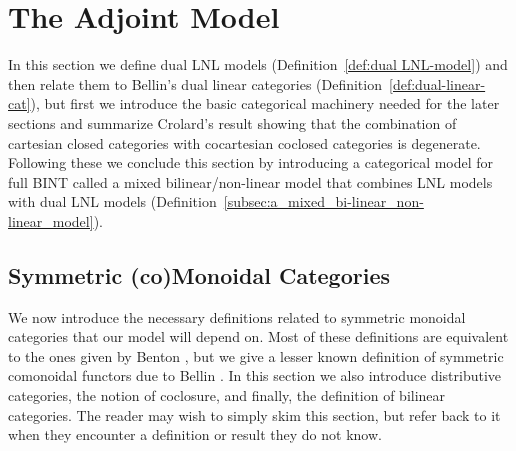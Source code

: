 \documentclass{lmcs}
\begin{document}


\section{The Adjoint Model}
\label{sec:adjoint_model}
In this section we define dual LNL models (Definition~\ref{def:dual
  LNL-model}) and then relate them to Bellin's dual linear categories
(Definition~\ref{def:dual-linear-cat}), but first we introduce the
basic categorical machinery needed for the later sections and
summarize Crolard's result showing that the combination of cartesian
closed categories with cocartesian coclosed categories is degenerate.
Following these we conclude this section by introducing a categorical
model for full BINT called a mixed bilinear/non-linear model that
combines LNL models with dual LNL models
(Definition~\ref{subsec:a_mixed_bi-linear_non-linear_model}).

\subsection{Symmetric (co)Monoidal Categories}
\label{subsec:symmetric_monoidal_categories}
We now introduce the necessary definitions related to symmetric
monoidal categories that our model will depend on.  Most of these
definitions are equivalent to the ones given by Benton
\cite{Benton:1994}, but we give a lesser known definition of symmetric
comonoidal functors due to Bellin \cite{Bellin:2012}.  In this
section we also introduce distributive categories, the notion of
coclosure, and finally, the definition of bilinear categories.  The
reader may wish to simply skim this section, but refer back to it when
they encounter a definition or result they do not know.
\end{document}
